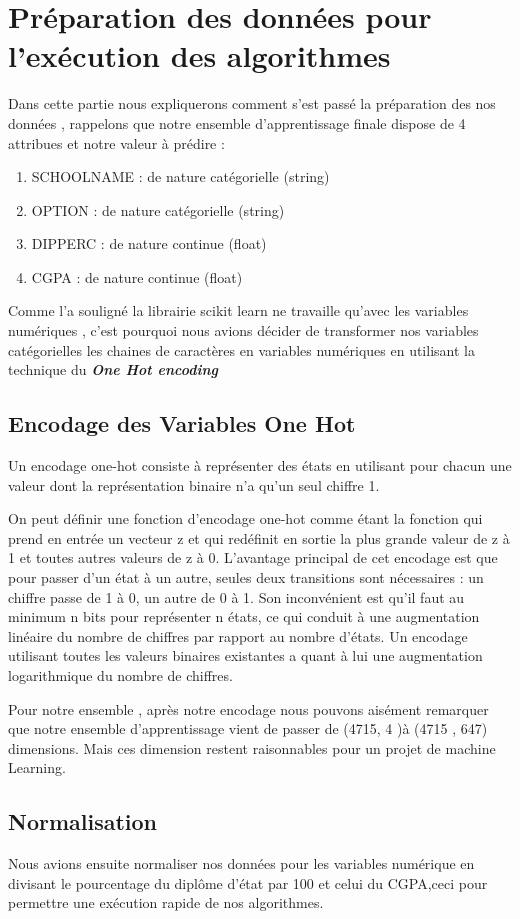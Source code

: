 \section {Préparation des données pour l'exécution des algorithmes } 
Dans cette partie nous expliquerons comment s'est passé la préparation des nos données , rappelons que notre ensemble d'apprentissage finale dispose de 4 attribues et notre valeur à prédire :
\begin{enumerate}
	\item  SCHOOLNAME : de nature catégorielle (string)
	\item  OPTION : de nature catégorielle (string)
	\item  DIPPERC : de nature continue (float)
	\item  CGPA : de nature continue (float)
\end{enumerate}
Comme l'a souligné \cite{OneHotEncoding} la librairie scikit learn ne travaille qu'avec les variables numériques , c'est pourquoi nous avions décider de transformer nos variables catégorielles les chaines de caractères en variables numériques en utilisant la technique du \emph{\textbf{One Hot encoding}} 
\subsection{Encodage des Variables One Hot }
Un encodage one-hot consiste à représenter des états en utilisant pour chacun une valeur dont la représentation binaire n'a qu'un seul chiffre 1.

On peut définir une fonction d'encodage one-hot comme étant la fonction qui prend en entrée un vecteur  z et qui redéfinit en sortie la plus grande valeur de  z à 1 et toutes autres valeurs de  z à 0.
L'avantage principal de cet encodage est que pour passer d'un état à un autre, seules deux transitions sont nécessaires : un chiffre passe de 1 à 0, un autre de 0 à 1. Son inconvénient est qu'il faut au minimum n bits pour représenter n états, ce qui conduit à une augmentation linéaire du nombre de chiffres par rapport au nombre d'états. Un encodage utilisant toutes les valeurs binaires existantes a quant à lui une augmentation logarithmique du nombre de chiffres.

Pour notre ensemble , après notre encodage nous pouvons aisément remarquer que notre ensemble d'apprentissage vient de passer de (4715, 4 )à (4715 , 647)  dimensions.
Mais ces dimension restent raisonnables pour un projet de machine Learning. 
\subsection{Normalisation  } 
Nous avions ensuite normaliser nos données pour les variables numérique en divisant le pourcentage du diplôme d'état par 100 et celui du CGPA,ceci pour permettre une exécution rapide de nos algorithmes. 
